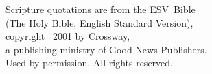 \documentclass[twocolumn,paper=179mm:239mm,pagesize=auto,11pt,headinclude=on,openany,oneside]{scrbook}
\begin{document}
\onecolumn






\vfill
\begin{center}
\small
Scripture quotations are from the ESV\textregistered\ Bible\\
(The Holy Bible, English Standard Version\textregistered),\\
copyright \textcopyright\ 2001 by Crossway,\\
a publishing ministry of Good News Publishers.\\
Used by permission. All rights reserved.
\end{center}
\end{document}
